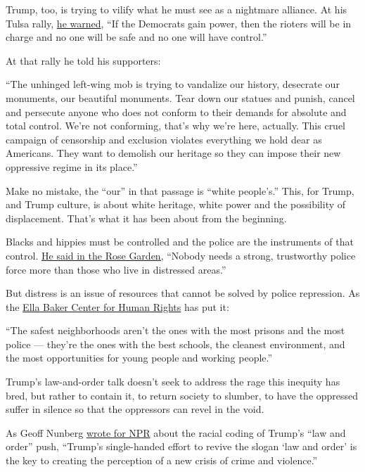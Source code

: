 Trump, too, is trying to vilify what he must see as a nightmare
alliance. At his Tulsa rally,
\href{https://www.rev.com/blog/transcripts/donald-trump-tulsa-oklahoma-rally-speech-transcript}{he
warned}, ``If the Democrats gain power, then the rioters will be in
charge and no one will be safe and no one will have control.''

At that rally he told his supporters:

``The unhinged left-wing mob is trying to vandalize our history,
desecrate our monuments, our beautiful monuments. Tear down our statues
and punish, cancel and persecute anyone who does not conform to their
demands for absolute and total control. We're not conforming, that's why
we're here, actually. This cruel campaign of censorship and exclusion
violates everything we hold dear as Americans. They want to demolish our
heritage so they can impose their new oppressive regime in its place.''

Make no mistake, the ``our'' in that passage is ``white people's.''
This, for Trump, and Trump culture, is about white heritage, white power
and the possibility of displacement. That's what it has been about from
the beginning.

Blacks and hippies must be controlled and the police are the instruments
of that control.
\href{https://www.rev.com/blog/transcripts/donald-trump-press-conference-transcript-on-policing-june-16}{He
said in the Rose Garden,} ``Nobody needs a strong, trustworthy police
force more than those who live in distressed areas.''

But distress is an issue of resources that cannot be solved by police
repression. As the
\href{https://ellabakercenter.org/blog/2011/08/how-to-turn-a-single-day-of-service-into-long-lasting-impact}{Ella
Baker Center for Human Rights} has put it:

``The safest neighborhoods aren't the ones with the most prisons and the
most police --- they're the ones with the best schools, the cleanest
environment, and the most opportunities for young people and working
people.''

Trump's law-and-order talk doesn't seek to address the rage this
inequity has bred, but rather to contain it, to return society to
slumber, to have the oppressed suffer in silence so that the oppressors
can revel in the void.

As Geoff Nunberg
\href{https://www.npr.org/2016/07/28/487560886/is-trumps-call-for-law-and-order-a-coded-racial-message}{wrote
for NPR} about the racial coding of Trump's ``law and order'' push,
``Trump's single-handed effort to revive the slogan `law and order' is
the key to creating the perception of a new crisis of crime and
violence.''

